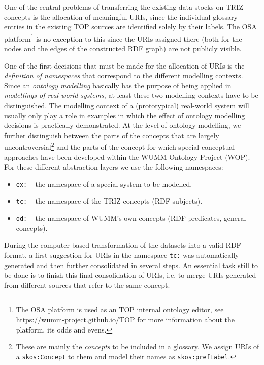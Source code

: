 \documentclass[11pt,a4paper]{article}
\begin{document}
One of the central problems of transferring the existing data stocks on TRIZ
concepts is the allocation of meaningful URIs, since the individual glossary
entries in the existing TOP sources are identified solely by their labels.
The OSA platform\footnote{The OSA platform is used as an TOP internal ontology
  editor, see \url{https://wumm-project.github.io/TOP} for more information
  about the platform, its odds and evens.} is no exception to this since the
URIs assigned there (both for the nodes and the edges of the constructed RDF
graph) are not publicly visible.

One of the first decisions that must be made for the allocation of URIs is the
\emph{definition of namespaces} that correspond to the different modelling
contexts. Since an \emph{ontology modelling} basically has the purpose of
being applied in \emph{modellings of real-world systems}, at least these two
modelling contexts have to be distinguished. The modelling context of a
(prototypical) real-world system will usually only play a role in examples in
which the effect of ontology modelling decisions is practically demonstrated.
At the level of ontology modelling, we further distinguish between the parts
of the concepts that are largely uncontroversial\footnote{These are mainly the
  \emph{concepts} to be included in a glossary. We assign URIs of a
  \texttt{skos:Concept} to them and model their names as
  \texttt{skos:prefLabel}.} and the parts of the concept for which special
conceptual approaches have been developed within the WUMM Ontology Project
(WOP).  For these different abstraction layers we use the following
namespaces:
\begin{itemize}[noitemsep]
\item \texttt{ex:} -- the namespace of a special system to be modelled. 
\item \texttt{tc:} -- the namespace of the TRIZ concepts (RDF subjects).
\item \texttt{od:} -- the namespace of WUMM's own concepts (RDF predicates,
  general concepts). 
\end{itemize}

During the computer based transformation of the datasets into a valid RDF
format, a first suggestion for URIs in the namespace \texttt{tc:} was
automatically generated and then further consolidated in several steps. An
essential task still to be done is to finish this final consolidation of URIs,
i.e. to merge URIs generated from different sources that refer to the same
concept.
\end{document}
